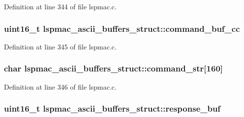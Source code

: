 Definition at line 344 of file lspmac.\-c.

\hypertarget{structlspmac__ascii__buffers__struct_a4d11efeb1eef407d811d3f9b774adc54}{
\subsubsection[{command\-\_\-buf\-\_\-cc}]{\setlength{\rightskip}{0pt plus 5cm}uint16\-\_\-t lspmac\-\_\-ascii\-\_\-buffers\-\_\-struct\-::command\-\_\-buf\-\_\-cc}}\label{structlspmac__ascii__buffers__struct_a4d11efeb1eef407d811d3f9b774adc54}


Definition at line 345 of file lspmac.\-c.

\hypertarget{structlspmac__ascii__buffers__struct_abe6a433dd9be4781dbf7e31d16484a4b}{
\subsubsection[{command\-\_\-str}]{\setlength{\rightskip}{0pt plus 5cm}char lspmac\-\_\-ascii\-\_\-buffers\-\_\-struct\-::command\-\_\-str\mbox{[}160\mbox{]}}}\label{structlspmac__ascii__buffers__struct_abe6a433dd9be4781dbf7e31d16484a4b}


Definition at line 346 of file lspmac.\-c.

\hypertarget{structlspmac__ascii__buffers__struct_ae1d37cf9568478c9d8dad540ce77183c}{
\subsubsection[{response\-\_\-buf}]{\setlength{\rightskip}{0pt plus 5cm}uint16\-\_\-t lspmac\-\_\-ascii\-\_\-buffers\-\_\-struct\-::response\-\_\-buf}}\label{structlspmac__ascii__buffers__struct_ae1d37cf9568478c9d8dad540ce77183c}


